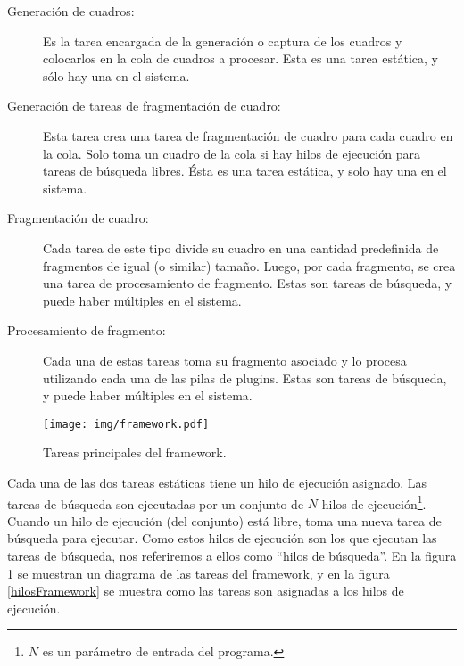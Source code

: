 \begin{description}

	\item[Generación de cuadros:] Es la tarea encargada de la generación o
		captura de los cuadros y colocarlos en la cola de cuadros a
		procesar. Esta es una tarea estática, y sólo hay una en el
		sistema.

	\item[Generación de tareas de fragmentación de cuadro:] Esta tarea crea
		una tarea de fragmentación de cuadro para cada cuadro en la
		cola. Solo toma un cuadro de la cola si hay hilos de ejecución
		para tareas de búsqueda libres. Ésta es una tarea estática, y
		solo hay una en el sistema.

	\item[Fragmentación de cuadro:] Cada tarea de este tipo divide su cuadro
		en una cantidad predefinida de fragmentos de igual (o similar)
		tamaño. Luego, por cada fragmento, se crea una tarea de
		procesamiento de fragmento. Estas son tareas de búsqueda, y
		puede haber múltiples en el sistema.

	\item[Procesamiento de fragmento:] Cada una de estas tareas toma su
		fragmento asociado y lo procesa utilizando cada una de las pilas
		de plugins. Estas son tareas de búsqueda, y puede haber
		múltiples en el sistema.

\end{description}

\begin{figure}[!h]

	\centering

	\texttt{[image: img/framework.pdf]}

	\caption{Tareas principales del framework.}

	\label{tareasFramework}

\end{figure}

Cada una de las dos tareas estáticas tiene un hilo de ejecución asignado. Las
tareas de búsqueda son ejecutadas por un conjunto de $N$ hilos de
ejecución\footnote{$N$ es un parámetro de entrada del programa.}. Cuando un hilo
de ejecución (del conjunto) está libre, toma una nueva tarea de búsqueda para
ejecutar. Como estos hilos de ejecución son los que ejecutan las tareas de
búsqueda, nos referiremos a ellos como ``hilos de búsqueda''. En la figura
\ref{tareasFramework} se muestran un diagrama de las tareas del framework, y en
la figura \ref{hilosFramework} se muestra como las tareas son asignadas a los
hilos de ejecución.

